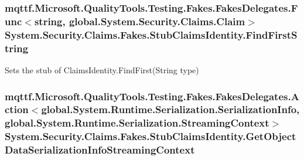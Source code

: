 \hypertarget{class_system_1_1_security_1_1_claims_1_1_fakes_1_1_stub_claims_identity_aa98f7874dacb23bdbdd1501d9483e943}{
\subsubsection[{Find\-First\-String}]{\setlength{\rightskip}{0pt plus 5cm}mqttf.\-Microsoft.\-Quality\-Tools.\-Testing.\-Fakes.\-Fakes\-Delegates.\-Func$<$string, global.\-System.\-Security.\-Claims.\-Claim$>$ System.\-Security.\-Claims.\-Fakes.\-Stub\-Claims\-Identity.\-Find\-First\-String}}\label{class_system_1_1_security_1_1_claims_1_1_fakes_1_1_stub_claims_identity_aa98f7874dacb23bdbdd1501d9483e943}


Sets the stub of Claims\-Identity.\-Find\-First(\-String type)

\hypertarget{class_system_1_1_security_1_1_claims_1_1_fakes_1_1_stub_claims_identity_a6c772057dbeca1f288c36913094d3518}{
\subsubsection[{Get\-Object\-Data\-Serialization\-Info\-Streaming\-Context}]{\setlength{\rightskip}{0pt plus 5cm}mqttf.\-Microsoft.\-Quality\-Tools.\-Testing.\-Fakes.\-Fakes\-Delegates.\-Action$<$global.\-System.\-Runtime.\-Serialization.\-Serialization\-Info, global.\-System.\-Runtime.\-Serialization.\-Streaming\-Context$>$ System.\-Security.\-Claims.\-Fakes.\-Stub\-Claims\-Identity.\-Get\-Object\-Data\-Serialization\-Info\-Streaming\-Context}}\label{class_system_1_1_security_1_1_claims_1_1_fakes_1_1_stub_claims_identity_a6c772057dbeca1f288c36913094d3518}


